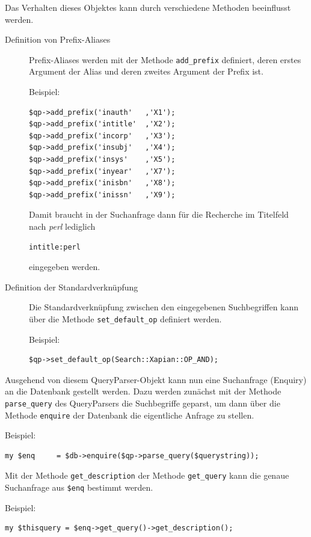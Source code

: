 \documentclass[11pt, twoside, a4paper, BCOR8mm, DIV12, bibtotoc,idxtotoc]{scrbook}
\begin{document}
Das Verhalten dieses Objektes kann durch verschiedene Methoden
beeinflusst werden.

\begin{description}
\item[Definition von Prefix-Aliases] Prefix-Aliases werden mit der
  Methode \texttt{add\_prefix} definiert, deren erstes Argument der
  Alias und deren zweites Argument der Prefix ist.

  Beispiel:
\begin{verbatim}
$qp->add_prefix('inauth'   ,'X1');
$qp->add_prefix('intitle'  ,'X2');
$qp->add_prefix('incorp'   ,'X3');
$qp->add_prefix('insubj'   ,'X4');
$qp->add_prefix('insys'    ,'X5');
$qp->add_prefix('inyear'   ,'X7');
$qp->add_prefix('inisbn'   ,'X8');
$qp->add_prefix('inissn'   ,'X9');
\end{verbatim}

  Damit braucht in der Suchanfrage dann für die Recherche im
  Titelfeld nach \emph{perl} lediglich
\begin{verbatim}
intitle:perl
\end{verbatim}
eingegeben werden.
\item[Definition der Standardverknüpfung] Die Standardverknüpfung
  zwischen den eingegebenen Such\-be\-griffen kann über die Methode
  \texttt{set\_default\_op} definiert werden.

  Beispiel:
\begin{verbatim}
$qp->set_default_op(Search::Xapian::OP_AND);
\end{verbatim}
\end{description}

Ausgehend von diesem QueryParser-Objekt kann nun eine Suchanfrage
(Enquiry) an die Daten\-bank gestellt werden. Dazu werden zunächst mit der
Methode \texttt{parse\_query} des QueryParsers die Suchbegriffe
geparst, um dann über die Methode \texttt{enquire} der Datenbank die
eigentliche Anfrage zu stellen.

Beispiel:
\begin{verbatim}
my $enq     = $db->enquire($qp->parse_query($querystring));
\end{verbatim}

Mit der Methode \texttt{get\_description} der Methode
\texttt{get\_query} kann die genaue Suchanfrage aus \texttt{\$enq}
bestimmt werden.

Beispiel:
\begin{verbatim}
my $thisquery = $enq->get_query()->get_description();
\end{verbatim}
\end{document}
